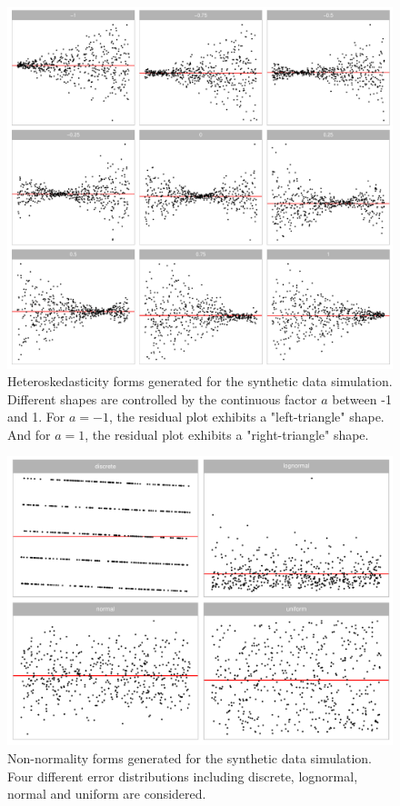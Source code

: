 \documentclass[]{interact}
\theoremstyle{plain}%
\theoremstyle{definition}
\theoremstyle{remark}
\begin{document}
\begin{figure}[!h]

{\centering \includegraphics[width=1\linewidth]{paper_files/figure-latex/different-a-1} 

}

\caption{Heteroskedasticity forms generated for the synthetic data simulation. Different shapes are controlled by the continuous factor $a$ between -1 and 1. For $a = -1$, the residual plot exhibits a "left-triangle" shape. And for $a = 1$, the residual plot exhibits a "right-triangle" shape. }\label{fig:different-a}
\end{figure}

\begin{figure}[!h]

{\centering \includegraphics[width=1\linewidth]{paper_files/figure-latex/different-e-1} 

}

\caption{Non-normality forms generated for the synthetic data simulation. Four different error distributions including discrete, lognormal, normal and uniform are considered.}\label{fig:different-e}
\end{figure}
\end{document}
